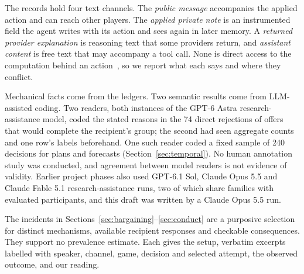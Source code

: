 The records hold four text channels. The \emph{public message} accompanies the applied action and can reach other players. The \emph{applied private note} is an instrumented field the agent writes with its action and sees again in later memory. A \emph{returned provider explanation} is reasoning text that some providers return, and \emph{assistant content} is free text that may accompany a tool call. None is direct access to the computation behind an action~\cite{turpin2023unfaithful,lanham2023faithfulness,chen2025cotfaithful}, so we report what each says and where they conflict.

Mechanical facts come from the ledgers. Two semantic results come from LLM-assisted coding. Two readers, both instances of the GPT-6 Astra research-assistance model, coded the stated reasons in the 74 direct rejections of offers that would complete the recipient's group; the second had seen aggregate counts and one row's labels beforehand. One such reader coded a fixed sample of 240 decisions for plans and forecasts (Section~\ref{sec:temporal}). No human annotation study was conducted, and agreement between model readers is not evidence of validity. Earlier project phases also used GPT-6.1 Sol, Claude Opus 5.5 and Claude Fable 5.1 research-assistance runs, two of which share families with evaluated participants, and this draft was written by a Claude Opus 5.5 run.

The incidents in Sections~\ref{sec:bargaining}--\ref{sec:conduct} are a purposive selection for distinct mechanisms, available recipient responses and checkable consequences. They support no prevalence estimate. Each gives the setup, verbatim excerpts labelled with speaker, channel, game, decision and selected attempt, the observed outcome, and our reading.

\FloatBarrier
